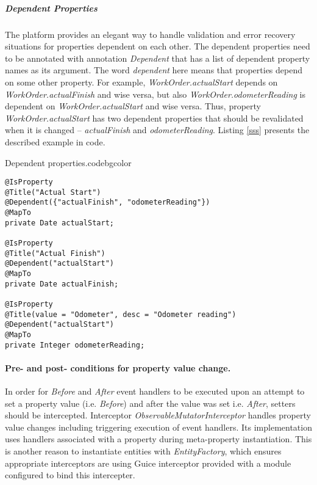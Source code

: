   \subparagraph*{Dependent Properties}

  The platform provides an elegant way to handle validation and error recovery situations for properties dependent on each other. 
  The dependent properties need to be annotated with annotation \emph{Dependent} that has a list of dependent property names as its argument. 
  The word \emph{dependent} here means that properties depend on some other property. 
  For example, \emph{WorkOrder.actualStart} depends on \emph{WorkOrder.actualFinish} and wise versa, but also \emph{WorkOrder.odometerReading} is dependent on \emph{WorkOrder.actualStart} and wise versa. 
  Thus, property \emph{WorkOrder.actualStart} has two dependent properties that should be revalidated when it is changed -- \emph{actualFinish} and \emph{odometerReading}.
  Listing \ref{sss} presents the described example in code.

  \begin{code}{Dependent properties.}{\label{lst:DependentProperties}}{codebgcolor}
    \begin{lstlisting}
@IsProperty
@Title("Actual Start")
@Dependent({"actualFinish", "odometerReading"})
@MapTo
private Date actualStart;

@IsProperty
@Title("Actual Finish")
@Dependent("actualStart")
@MapTo
private Date actualFinish;

@IsProperty
@Title(value = "Odometer", desc = "Odometer reading")
@Dependent("actualStart")
@MapTo
private Integer odometerReading;
    \end{lstlisting}
  \end{code}



  \paragraph*{Pre- and post- conditions for property value change.}
  
  In order for \emph{Before} and \emph{After} event handlers to be executed upon an attempt to set a property value (i.e. \emph{Before}) and after the value was set {i.e. \emph{After}}, setters should be intercepted. 
  Interceptor \emph{ObservableMutatorInterceptor} handles property value changes including triggering execution of event handlers. 
  Its implementation uses handlers associated with a property during meta-property instantiation. 
  This is another reason to instantiate entities with \emph{EntityFactory}, which ensures appropriate interceptors are using Guice interceptor provided with a module configured to bind this intercepter.
  

